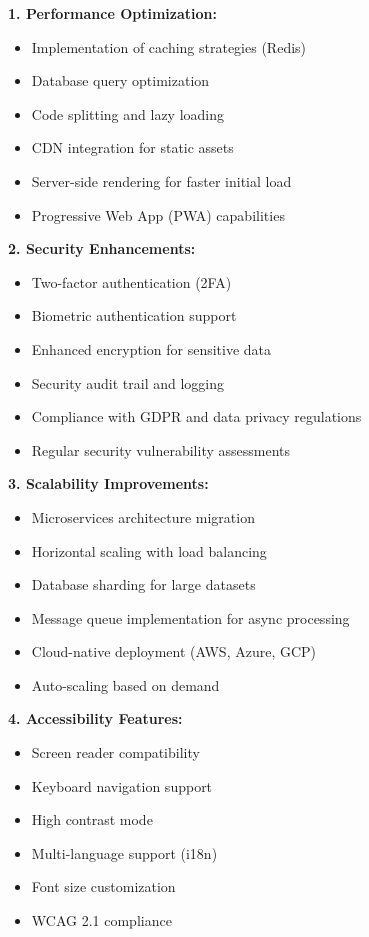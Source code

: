 \textbf{1. Performance Optimization:}
\begin{itemize}
    \item Implementation of caching strategies (Redis)
    \item Database query optimization
    \item Code splitting and lazy loading
    \item CDN integration for static assets
    \item Server-side rendering for faster initial load
    \item Progressive Web App (PWA) capabilities
\end{itemize}

\textbf{2. Security Enhancements:}
\begin{itemize}
    \item Two-factor authentication (2FA)
    \item Biometric authentication support
    \item Enhanced encryption for sensitive data
    \item Security audit trail and logging
    \item Compliance with GDPR and data privacy regulations
    \item Regular security vulnerability assessments
\end{itemize}

\textbf{3. Scalability Improvements:}
\begin{itemize}
    \item Microservices architecture migration
    \item Horizontal scaling with load balancing
    \item Database sharding for large datasets
    \item Message queue implementation for async processing
    \item Cloud-native deployment (AWS, Azure, GCP)
    \item Auto-scaling based on demand
\end{itemize}

\textbf{4. Accessibility Features:}
\begin{itemize}
    \item Screen reader compatibility
    \item Keyboard navigation support
    \item High contrast mode
    \item Multi-language support (i18n)
    \item Font size customization
    \item WCAG 2.1 compliance
\end{itemize}

